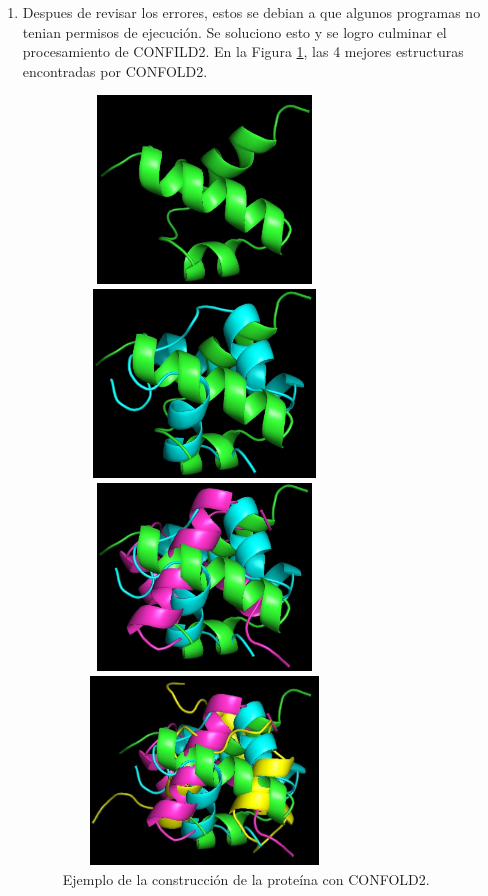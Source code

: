 \documentclass{article}
\begin{document}
\begin{enumerate}
		\item Despues de revisar los errores, estos se debian a que algunos programas no tenian permisos de ejecución. Se soluciono esto y se logro culminar el procesamiento de CONFILD2. En la Figura \ref{fig:confold2}, las 4 mejores estructuras encontradas por CONFOLD2.
	
		\begin{figure}[H]
			\centering
			\begin{multicols}{2}
				\includegraphics[width=7.5cm,height=5cm]{img/papers/top_model_1}\par 
				\includegraphics[width=7.5cm,height=5cm]{img/papers/top_model_2}\par 
				\includegraphics[width=7.5cm,height=5cm]{img/papers/top_model_3}\par 
				\includegraphics[width=7.5cm,height=5cm]{img/papers/top_model_4}\par 
			\end{multicols}
			\caption{Ejemplo de la construcción de la proteína con CONFOLD2.}
			\label{fig:confold2}
		\end{figure}
		
	\end{enumerate}
	

	



	
	
	\clearpage
	
	
	
	
	
	
	
\end{document}
